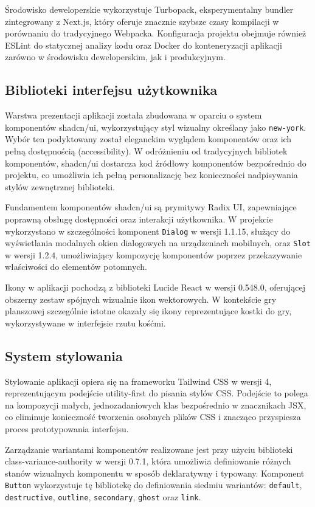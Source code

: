 \documentclass[12pt, a4paper]{article}
\begin{document}
Środowisko deweloperskie wykorzystuje Turbopack, eksperymentalny bundler zintegrowany z Next.js, który oferuje znacznie szybsze czasy kompilacji w porównaniu do tradycyjnego Webpacka. Konfiguracja projektu obejmuje również ESLint do statycznej analizy kodu oraz Docker do konteneryzacji aplikacji zarówno w środowisku deweloperskim, jak i produkcyjnym.

\subsection{Biblioteki interfejsu użytkownika}

Warstwa prezentacji aplikacji została zbudowana w oparciu o system komponentów shadcn/ui, wykorzystujący styl wizualny określany jako \texttt{new-york}. Wybór ten podyktowany został eleganckim wyglądem komponentów oraz ich pełną dostępnością (accessibility). W odróżnieniu od tradycyjnych bibliotek komponentów, shadcn/ui dostarcza kod źródłowy komponentów bezpośrednio do projektu, co umożliwia ich pełną personalizację bez konieczności nadpisywania stylów zewnętrznej biblioteki.

Fundamentem komponentów shadcn/ui są prymitywy Radix UI, zapewniające poprawną obsługę dostępności oraz interakcji użytkownika. W projekcie wykorzystano w szczególności komponent \texttt{Dialog} w wersji 1.1.15, służący do wyświetlania modalnych okien dialogowych na urządzeniach mobilnych, oraz \texttt{Slot} w wersji 1.2.4, umożliwiający kompozycję komponentów poprzez przekazywanie właściwości do elementów potomnych.

Ikony w aplikacji pochodzą z biblioteki Lucide React w wersji 0.548.0, oferującej obszerny zestaw spójnych wizualnie ikon wektorowych. W kontekście gry planszowej szczególnie istotne okazały się ikony reprezentujące kostki do gry, wykorzystywane w interfejsie rzutu kośćmi.

\subsection{System stylowania}

Stylowanie aplikacji opiera się na frameworku Tailwind CSS w wersji 4, reprezentującym podejście utility-first do pisania stylów CSS. Podejście to polega na kompozycji małych, jednozadaniowych klas bezpośrednio w znacznikach JSX, co eliminuje konieczność tworzenia osobnych plików CSS i znacząco przyspiesza proces prototypowania interfejsu.

Zarządzanie wariantami komponentów realizowane jest przy użyciu biblioteki class-variance-authority w wersji 0.7.1, która umożliwia definiowanie różnych stanów wizualnych komponentu w sposób deklaratywny i typowany. Komponent \texttt{Button} wykorzystuje tę bibliotekę do definiowania siedmiu wariantów: \texttt{default}, \texttt{destructive}, \texttt{outline}, \texttt{secondary}, \texttt{ghost} oraz \texttt{link}.
\end{document}
